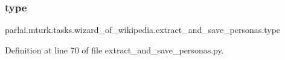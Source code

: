 \subsubsection{\texorpdfstring{type}{type}}
{\footnotesize\ttfamily parlai.\+mturk.\+tasks.\+wizard\+\_\+of\+\_\+wikipedia.\+extract\+\_\+and\+\_\+save\+\_\+personas.\+type}



Definition at line 70 of file extract\+\_\+and\+\_\+save\+\_\+personas.\+py.

